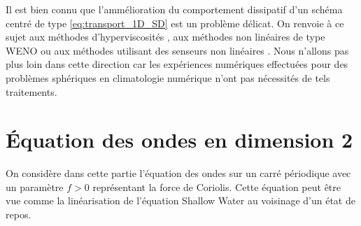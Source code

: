 Il est bien connu que l'ammélioration du comportement dissipatif d'un schéma centré de type \eqref{eq:transport_1D_SD} est un problème délicat. On renvoie à ce sujet aux méthodes d'hyperviscosités \cite{Cook2005}, aux méthodes non linéaires de type WENO \cite{Qiu2002} ou aux méthodes utilisant des senseurs non linéaires \cite{Yee1989}. Nous n'allons pas plus loin dans cette direction car les expériences numériques effectuées pour des problèmes sphériques en climatologie numérique n'ont pas nécessités de tels traitements.














































\section{Équation des ondes en dimension 2}

On considère dans cette partie l'équation des ondes sur un carré périodique avec un paramètre $f > 0$ représentant la force de Coriolis. Cette équation peut être vue comme la linéarisation de l'équation Shallow Water  au voisinage d'un état de repos.

